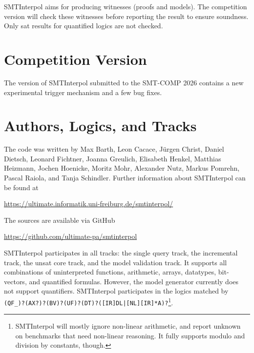 \documentclass[a4paper]{easychair}
\newcommand\SI{SMTInterpol\xspace}
\begin{document}
\SI aims for producing witnesses (proofs and models).  The competition version will check these witnesses before reporting the result to ensure soundness.  Only sat results for quantified logics are not checked.

\section*{Competition Version}
The version of \SI submitted to the SMT-COMP 2026 contains a
new experimental trigger mechanism and a few bug fixes.

\section*{Authors, Logics, and Tracks}
The code was written by Max Barth, Leon Cacace, J{\"u}rgen Christ, Daniel Dietsch, Leonard Fichtner, Joanna Greulich, Elisabeth Henkel, Matthias Heizmann, Jochen Hoenicke, Moritz Mohr, Alexander Nutz, Markus Pomrehn, Pascal Raiola, and Tanja Schindler.
Further information about \SI can be found at
\begin{center}
  \url{https://ultimate.informatik.uni-freiburg.de/smtinterpol/}
\end{center}
The sources are available via GitHub
\begin{center}
  \url{https://github.com/ultimate-pa/smtinterpol}
\end{center}

\SI participates in all tracks: the single query track, the incremental track, the unsat core track, and the model validation track.
It supports all combinations of uninterpreted functions, arithmetic, arrays, datatypes, bit-vectors, and quantified formulas.
However, the model generator currently does not support quantifiers.
%
\SI participates in the logics matched by
\verb!(QF_)?(AX?)?(BV)?(UF)?(DT)?([IR]DL|[NL][IR]*A)?!\footnote{\SI will mostly ignore non-linear arithmetic, and report unknown on benchmarks that need non-linear reasoning.  It fully supports modulo and division by constants, though.}.



\end{document}
